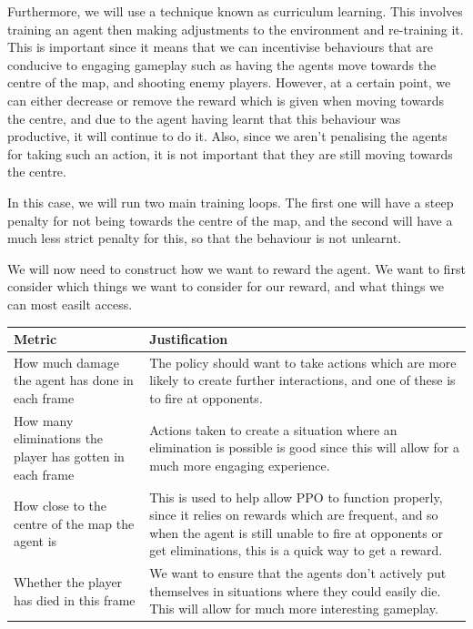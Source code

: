 \vs

Furthermore, we will use a technique known as curriculum learning. This involves training an agent then making adjustments to the environment and re-training it. This is important since it means that we can incentivise behaviours that are conducive to engaging gameplay such as having the agents move towards the centre of the map, and shooting enemy players. However, at a certain point, we can either decrease or remove the reward which is given when moving towards the centre, and due to the agent having learnt that this behaviour was productive, it will continue to do it. Also, since we aren't penalising the agents for taking such an action, it is not important that they are still moving towards the centre.

\vs
In this case, we will run two main training loops. The first one will have a steep penalty for not being towards the centre of the map, and the second will have a much less strict penalty for this, so that the behaviour is not unlearnt.

\vs
We will now need to construct how we want to reward the agent. We want to first consider which things we want to consider for our reward, and what things we can most easilt access.

\vs
\begin{center}
\begin{longtable}{|p{6cm}|p{9.5cm}|}
    \hline
    Metric & Justification\\
    \hline
    \hline
    How much damage the agent has done in each frame & The policy should want to take actions which are more likely to create further interactions, and one of these is to fire at opponents.\\
    \hline
    How many eliminations the player has gotten in each frame & Actions taken to create a situation where an elimination is possible is good since this will allow for a much more engaging experience.\\
    \hline
    How close to the centre of the map the agent is & This is used to help allow PPO to function properly, since it relies on rewards which are frequent, and so when the agent is still unable to fire at opponents or get eliminations, this is a quick way to get a reward.\\
    \hline
    Whether the player has died in this frame & We want to ensure that the agents don't actively put themselves in situations where they could easily die. This will allow for much more interesting gameplay.\\
    \hline
\end{longtable}
\end{center}


